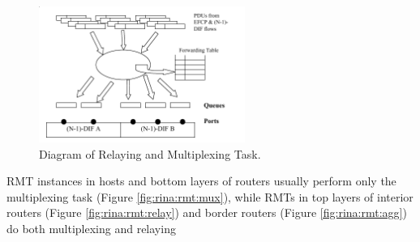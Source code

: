             \begin{figure}[H]
                \begin{center}
                    \includegraphics[width=0.6\textwidth]{fig/fwding_rmt-module.png}
                  \caption{Diagram of Relaying and Multiplexing Task.}
                  \label{fig:rina:rmt:model}
                \end{center}
            \end{figure}

            RMT instances in hosts and bottom layers of routers usually perform only the multiplexing task (Figure \ref{fig:rina:rmt:mux}), while RMTs in top layers of interior routers (Figure \ref{fig:rina:rmt:relay}) and border routers (Figure \ref{fig:rina:rmt:agg}) do both multiplexing and relaying

